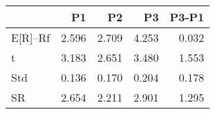 \begin{tabular}{lrrrr}
\toprule
 & P1 & P2 & P3 & P3-P1 \\
\midrule
E[R]--Rf & 2.596 & 2.709 & 4.253 & 0.032 \\
t & 3.183 & 2.651 & 3.480 & 1.553 \\
Std & 0.136 & 0.170 & 0.204 & 0.178 \\
SR & 2.654 & 2.211 & 2.901 & 1.295 \\
\bottomrule
\end{tabular}
